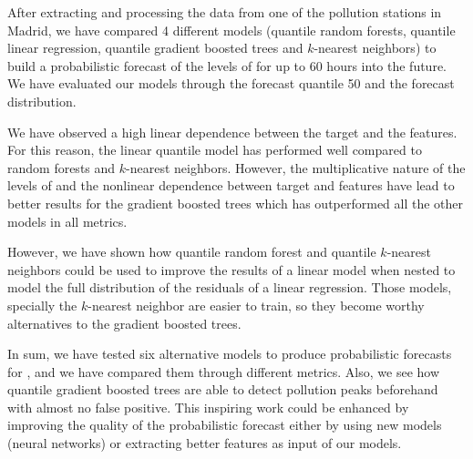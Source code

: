 \documentclass[a4paper,twocolumn,5p]{elsarticle}
\begin{document}
After extracting and processing the data from one of the pollution
stations in Madrid, we have compared 4 different models (quantile
random forests, quantile linear regression, quantile gradient boosted 
trees and
$k$-nearest neighbors) to build a probabilistic forecast of the levels
of \no for up to 60 hours into the future. We have
evaluated our models through the forecast quantile 50 and the forecast
distribution.

We have observed a high linear dependence between the target and the
features. For this reason, the linear quantile model has performed
well compared to random forests and $k$-nearest neighbors. However,
the multiplicative nature of the levels of \no and the
nonlinear dependence between target and features have lead to better
results for the gradient boosted trees which has outperformed all the
other models in all metrics.

However, we have shown how quantile random forest and quantile
$k$-nearest neighbors could be used to improve the results of a linear
model when nested to model the full distribution of the residuals of a
linear regression. Those models, specially the $k$-nearest neighbor
are easier to train, so they become worthy alternatives to the
gradient boosted trees.

In sum, we have tested six alternative models to produce probabilistic
forecasts for \no, and we have compared them through different
metrics.  Also, we see how quantile gradient boosted trees are able to
detect pollution peaks beforehand with almost no false positive. This
inspiring work could be enhanced by improving the quality of the
probabilistic forecast either by using new models (neural networks) or
extracting better features as input of our models.



\end{document}
